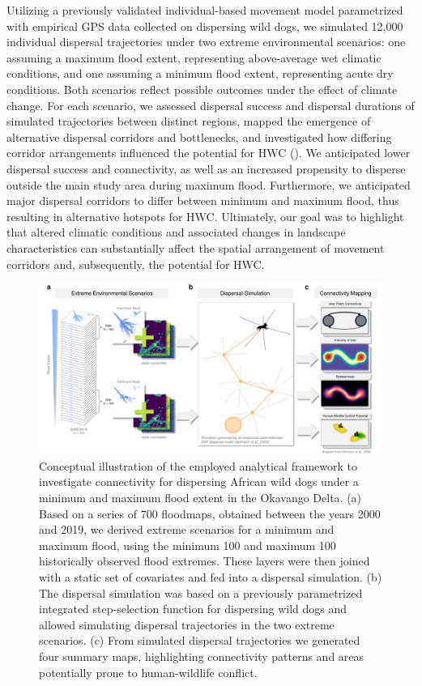 \documentclass[../FinalThesis.tex]{subfiles}
\begin{document}
Utilizing a previously validated individual-based movement model parametrized
with empirical GPS data collected on dispersing wild dogs, we simulated 12,000
individual dispersal trajectories under two extreme environmental scenarios: one
assuming a maximum flood extent, representing above-average wet climatic
conditions, and one assuming a minimum flood extent, representing acute dry
conditions. Both scenarios reflect possible outcomes under the effect of climate
change. For each scenario, we assessed dispersal success and dispersal durations
of simulated trajectories between distinct regions, mapped the emergence of
alternative dispersal corridors and bottlenecks, and investigated how differing
corridor arrangements influenced the potential for HWC (). We
anticipated lower dispersal success and connectivity, as well as an increased
propensity to disperse outside the main study area during maximum flood.
Furthermore, we anticipated major dispersal corridors to differ between minimum
and maximum flood, thus resulting in alternative hotspots for HWC. Ultimately,
our goal was to highlight that altered climatic conditions and associated
changes in landscape characteristics can substantially affect the spatial
arrangement of movement corridors and, subsequently, the potential for HWC.

\begin{figure}[htpb]
 \begin{center}
  \includegraphics[width = \textwidth]{Figures/GraphicalAbstract.pdf}
  \caption{Conceptual illustration of the employed analytical framework to
  investigate connectivity for dispersing African wild dogs under a minimum and
  maximum flood extent in the Okavango Delta. (a) Based on a series of 700
  floodmaps, obtained between the years 2000 and 2019, we derived extreme
  scenarios for a minimum and maximum flood, using the minimum 100 and maximum
  100 historically observed flood extremes. These layers were then joined with a
  static set of covariates and fed into a dispersal simulation. (b) The
  dispersal simulation was based on a previously parametrized integrated
  step-selection function for dispersing wild dogs and allowed simulating
  dispersal trajectories in the two extreme scenarios. (c) From simulated
  dispersal trajectories we generated four summary maps, highlighting
  connectivity patterns and areas potentially prone to human-wildlife conflict.}
  \label{Concept}
 \end{center}
\end{figure}
\end{document}
